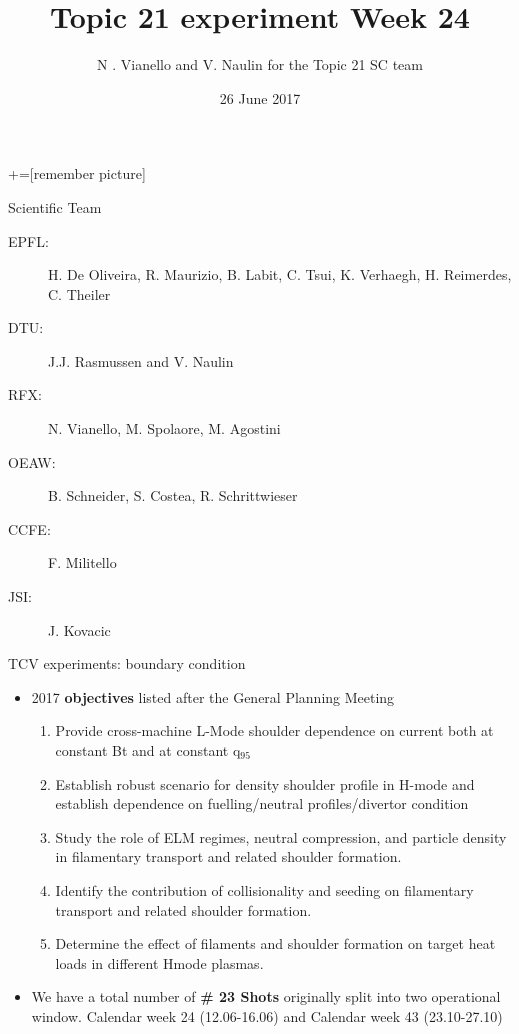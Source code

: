 \documentclass[10pt, compress]{beamer}
\title{Topic 21 experiment Week 24}
\date{26 June 2017}
\author[Topic 21 ST]{N . Vianello and V. Naulin for the
  Topic 21 SC team}
\newcommand\Fontvi{\fontsize{8}{7.2}\selectfont}
\begin{document}
+=[remember picture]
\maketitle
\begin{frame}{Scientific Team}
  \begin{description}
  \item[EPFL:] H. De Oliveira, R. Maurizio, B. Labit,
    C. Tsui, K. Verhaegh, H. Reimerdes, C. Theiler
  \item[DTU:] J.J. Rasmussen and V. Naulin
  \item[RFX:] N. Vianello, M. Spolaore, M. Agostini
  \item[OEAW:] B. Schneider, S. Costea, R. Schrittwieser
  \item[CCFE:] F. Militello
  \item[JSI:] J. Kovacic
  \end{description}
\end{frame}
\begin{frame}{TCV experiments: boundary condition}
\vspace{-1cm}
\Fontvi
\begin{itemize}
\item 2017 \textbf{objectives} listed after the General Planning Meeting
  \begin{enumerate}
  \item Provide cross-machine \alert{L-Mode} shoulder dependence on
    current both at constant Bt and at constant q$_{95}$
  \item Establish robust scenario for density shoulder profile in
        H-mode and establish dependence on fuelling/neutral
        profiles/divertor condition
  \item Study the role of ELM regimes, neutral compression, and
    particle density in filamentary transport and related shoulder
    formation.
  \item Identify the contribution of collisionality and
    seeding on filamentary transport and related shoulder
    formation.
  \item Determine the effect of filaments and shoulder
    formation on target heat loads in different Hmode plasmas.
  \end{enumerate}
\item We have a total number of \textbf{\# 23 Shots} originally split into two
    operational window. Calendar week 24 (12.06-16.06) and Calendar
    week 43 (23.10-27.10)
\end{itemize}
\end{frame}
\end{document}
